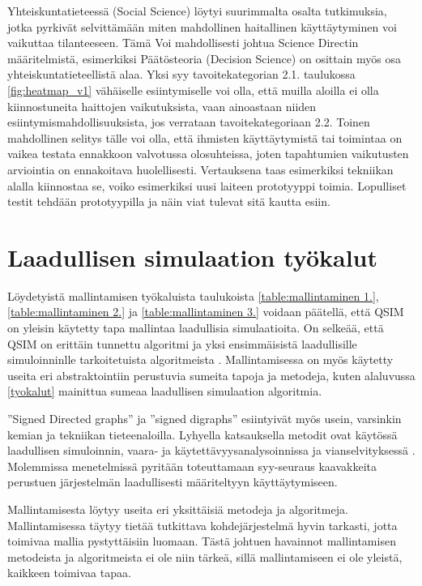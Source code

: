 \documentclass[utf8]{gradu3}
\begin{document}
Yhteiskuntatieteessä (Social Science) löytyi suurimmalta osalta tutkimuksia, 
jotka pyrkivät selvittämään miten mahdollinen haitallinen käyttäytyminen voi vaikuttaa
tilanteeseen. Tämä Voi mahdollisesti johtua Science Directin määritelmistä, esimerkiksi
Päätösteoria (Decision Science) on osittain myös osa yhteiskuntatieteellistä alaa. 
Yksi syy tavoitekategorian 2.1. taulukossa \ref{fig:heatmap_v1}
vähäiselle esiintymiselle voi olla, 
että muilla aloilla ei olla kiinnostuneita haittojen vaikutuksista,
vaan ainoastaan niiden esiintymismahdollisuuksista, 
jos verrataan tavoitekategoriaan 2.2.
Toinen mahdollinen selitys tälle voi olla, 
että ihmisten käyttäytymistä tai toimintaa on vaikea testata ennakkoon valvotussa olosuhteissa, 
joten tapahtumien vaikutusten arviointia on ennakoitava huolellisesti.
Vertauksena taas esimerkiksi tekniikan alalla kiinnostaa se, 
voiko esimerkiksi uusi laiteen prototyyppi toimia. 
Lopulliset testit tehdään prototyypilla ja näin viat tulevat sitä kautta esiin.

\section{Laadullisen simulaation työkalut}
Löydetyistä mallintamisen työkaluista taulukoista \ref{table:mallintaminen 1.},
\ref{table:mallintaminen 2.} ja \ref{table:mallintaminen 3.} voidaan päätellä, 
että QSIM on yleisin käytetty tapa mallintaa laadullisia simulaatioita.
On selkeää, että QSIM on erittäin tunnettu algoritmi ja yksi ensimmäisistä
laadullisille simuloinninlle tarkoitetuista algoritmeista
\parencite{kuipers1986qualitative}.
Mallintamisessa on myös käytetty useita eri abstraktointiin perustuvia sumeita tapoja ja metodeja, kuten alaluvussa \ref{tyokalut} mainittua sumeaa laadullisen simulaation algoritmia.

''Signed Directed graphs'' ja ''signed digraphs'' esiintyivät myös usein, 
varsinkin kemian ja tekniikan tieteenaloilla. Lyhyella katsauksella
metodit ovat käytössä laadullisen simuloinnin, vaara- ja käytettävyysanalysoinnissa 
ja vianselvityksessä \parencite{SDGapplication2004}.
Molemmissa menetelmissä pyritään toteuttamaan syy-seuraus kaavakkeita perustuen
järjestelmän laadullisesti määriteltyyn käyttäytymiseen.

Mallintamisesta löytyy useita eri yksittäisiä metodeja ja algoritmeja. 
Mallintamisessa täytyy tietää tutkittava kohdejärjestelmä hyvin tarkasti, 
jotta toimivaa mallia pystyttäisiin luomaan. Tästä johtuen havainnot 
mallintamisen metodeista ja algoritmeista ei ole niin tärkeä, sillä
mallintamiseen ei ole yleistä, kaikkeen toimivaa tapaa.
\end{document}
